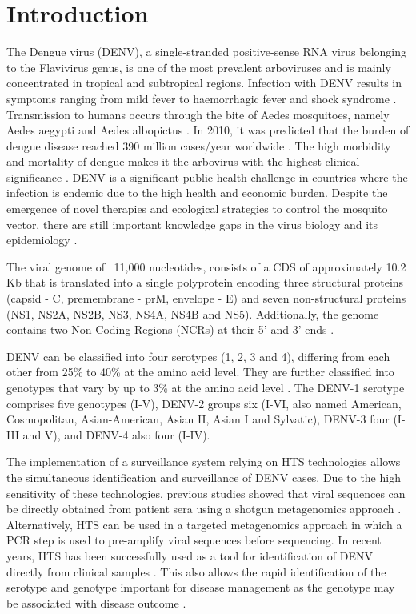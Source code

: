 \section{Introduction}

The Dengue virus (DENV), a single-stranded positive-sense RNA virus belonging to the Flavivirus genus, is one of the most prevalent arboviruses and is mainly concentrated in tropical and subtropical regions. Infection with DENV results in symptoms ranging from mild fever to haemorrhagic fever and shock syndrome \citep{organization_dengue_2009}. Transmission to humans occurs through the bite of Aedes mosquitoes, namely Aedes aegypti and Aedes albopictus \citep{diamond_molecular_2015}. In 2010, it was predicted that the burden of dengue disease reached 390 million cases/year worldwide \citep{bhatt_global_2013}. The high morbidity and mortality of dengue makes it the arbovirus with the highest clinical significance \citep{lourenco_challenges_2018}. DENV is a significant public health challenge in countries where the infection is endemic due to the high health and economic burden. Despite the emergence of novel therapies and ecological strategies to control the mosquito vector, there are still important knowledge gaps in the virus biology and its epidemiology \citep{diamond_molecular_2015}.

The viral genome of ~11,000 nucleotides, consists of a CDS of approximately 10.2 Kb that is translated into a single polyprotein encoding three structural proteins (capsid - C, premembrane - prM, envelope - E) and seven non-structural proteins (NS1, NS2A, NS2B, NS3, NS4A, NS4B and NS5). Additionally, the genome contains two Non-Coding Regions (NCRs) at their 5’ and 3’ ends \citep{leitmeyer_dengue_1999}.

DENV can be classified into four serotypes (1, 2, 3 and 4), differing from each other from 25\% to 40\% at the amino acid level. They are further classified into genotypes that vary by up to 3\% at the amino acid level \citep{diamond_molecular_2015}. The DENV-1 serotype comprises five genotypes (I-V), DENV-2 groups six (I-VI, also named American, Cosmopolitan, Asian-American, Asian II, Asian I and Sylvatic), DENV-3 four (I-III and V), and DENV-4 also four (I-IV).

The implementation of a surveillance system relying on HTS technologies allows the simultaneous identification and surveillance of DENV cases. Due to the high sensitivity of these technologies, previous studies showed that viral sequences can be directly obtained from patient sera using a shotgun metagenomics approach \citep{yozwiak_virus_2012}. Alternatively, HTS can be used in a targeted metagenomics approach in which a PCR step is used to pre-amplify viral sequences before sequencing. In recent years, HTS has been successfully used as a tool for identification of DENV directly from clinical samples \citep{yozwiak_virus_2012, lee_clinical_2017}. This also allows the rapid identification of the serotype and genotype important for disease management as the genotype may be associated with disease outcome \citep{fatima_serotype_2011}.

